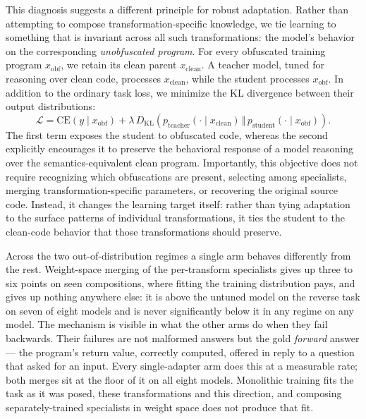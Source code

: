 This diagnosis suggests a different principle for robust adaptation.
Rather than attempting to compose transformation-specific knowledge,
we tie learning to something that is invariant across all such
transformations: the model's behavior on the corresponding
\emph{unobfuscated program}. For every obfuscated training program
$x_{\mathrm{obf}}$, we retain its clean parent
$x_{\mathrm{clean}}$. A teacher model, tuned for reasoning over clean
code, processes $x_{\mathrm{clean}}$, while the student processes
$x_{\mathrm{obf}}$. In addition to the ordinary task loss, we minimize
the KL divergence between their output distributions:
%
\begin{equation}
\mathcal{L}
=
\mathrm{CE}\!\left(y \mid x_{\mathrm{obf}}\right)
+
\lambda\,
D_{\mathrm{KL}}\!\left(
p_{\mathrm{teacher}}(\cdot \mid x_{\mathrm{clean}})
\,\Vert\,
p_{\mathrm{student}}(\cdot \mid x_{\mathrm{obf}})
\right).
\label{eq:paired_consistency}
\end{equation}
%
The first term exposes the student to obfuscated code, whereas the
second explicitly encourages it to preserve the behavioral response of
a model reasoning over the semantics-equivalent clean program.
Importantly, this objective does not require recognizing which
obfuscations are present, selecting among specialists, merging
transformation-specific parameters, or recovering the original source
code. Instead, it
changes the learning target itself: rather than tying adaptation to
the surface patterns of individual transformations, it ties the
student to the clean-code behavior that those transformations should
preserve.

Across the two out-of-distribution regimes a single arm behaves
differently from the rest. Weight-space merging of the per-transform
specialists gives up three to six points on seen compositions, where
fitting the training distribution pays, and gives up nothing anywhere
else: it is above the untuned model on the reverse task on seven of
eight models and is never significantly below it in any regime on any
model. The mechanism is visible in what the other arms do when they
fail backwards. Their failures are not malformed answers but the gold
\emph{forward} answer --- the program's return value, correctly
computed, offered in reply to a question that asked for an input. Every
single-adapter arm does this at a measurable rate; both merges sit at
the floor of it on all eight models. Monolithic training fits the task
as it was posed, these transformations and this direction, and
composing separately-trained specialists in weight space does not
produce that fit.

